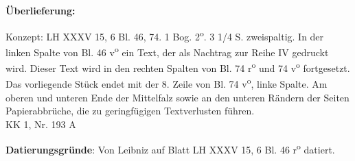       
               
                \begin{ledgroupsized}[r]{120mm}
                \footnotesize 
                \pstart                
                \noindent\textbf{\"{U}berlieferung:}   
                \pend
                \end{ledgroupsized}
            
              
                            \begin{ledgroupsized}[r]{114mm}
                            \footnotesize 
                            \pstart \parindent -6mm
                            Konzept: LH XXXV 15, 6 Bl. 46, 74. 1 Bog. 2\textsuperscript{o}. 3 1/4 S. zweispaltig. In der linken Spalte von Bl. 46 v\textsuperscript{o} ein Text, der als Nachtrag zur Reihe IV gedruckt wird.  Dieser Text wird in den rechten Spalten von Bl. 74 r\textsuperscript{o} und 74 v\textsuperscript{o} fortgesetzt. Das vorliegende St\"{u}ck endet mit der 8. Zeile von Bl. 74 v\textsuperscript{o}, linke Spalte. Am oberen und unteren Ende der Mittelfalz sowie an den unteren R\"{a}ndern der Seiten Papierabbr\"{u}che, die zu geringf\"{u}gigen Textverlusten f\"{u}hren.\\KK 1, Nr. 193 A \pend
                            \end{ledgroupsized}
                \vspace*{5mm}
                \begin{ledgroup}
                \footnotesize 
                \pstart
            \noindent\footnotesize{\textbf{Datierungsgr\"{u}nde}: Von Leibniz auf Blatt LH XXXV 15, 6 Bl. 46 r\textsuperscript{o} datiert.}
                \pend
                \end{ledgroup}
            
